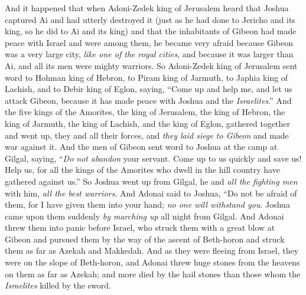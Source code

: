 \begin{biblechapter} %
 And it happened that when Adoni-Zedek king of Jerusalem heard that Joshua captured Ai and had utterly destroyed it (just as he had done to Jericho and its king, so he did to Ai and its king) and that the inhabitants of Gibeon had made peace with Israel and were among them,
\verse he became very afraid because Gibeon was a very large city, \textit{like one of the royal cities}, and because it was larger than Ai, and all its men were mighty warriors.
\verse So Adoni-Zedek king of Jerusalem sent word to Hohman king of Hebron, to Piram king of Jarmuth, to Japhia king of Lachish, and to Debir king of Eglon, saying,
\verse “Come up and help me, and let us attack Gibeon, because it has made peace with Joshua and the \textit{Israelites}.”
\verse And the five kings of the Amorites, the king of Jerusalem, the king of Hebron, the king of Jarmuth, the king of Lachish, and the king of Eglon, gathered together and went up, they and all their forces, and \textit{they laid siege to Gibeon} and made war against it.
\verse And the men of Gibeon sent word to Joshua at the camp at Gilgal, saying, “\textit{Do not abandon} your servant. Come up to us quickly and save us! Help us, for all the kings of the Amorites who dwell in the hill country have gathered against us.”
\verse So Joshua went up from Gilgal, he and \textit{all the fighting men} with him, \textit{all the best warriors}.
\verse And Adonai said to Joshua, “Do not be afraid of them, for I have given them into your hand; \textit{no one will withstand you}.
\verse Joshua came upon them suddenly \textit{by marching up} all night from Gilgal.
\verse And Adonai threw them into panic before Israel, who struck them with a great blow at Gibeon and pursued them by the way of the ascent of Beth-horon and struck them as far as Azekah and Makkedah.
\verse And as they were fleeing from Israel, they were on the slope of Beth-horon, and Adonai threw huge stones from the heavens on them as far as Azekah; and more died by the hail stones than those whom the \textit{Israelites} killed by the sword.

\end{biblechapter}
